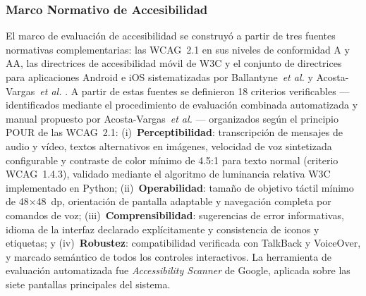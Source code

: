 \documentclass[journal]{IEEEtran}
\begin{document}
			\subsubsection{Marco Normativo de Accesibilidad}
				El marco de evaluaci\'on de accesibilidad se construy\'o a partir de tres fuentes normativas complementarias: las WCAG~2.1 \cite{w3c2018} en sus niveles de conformidad A y AA, las directrices de accesibilidad m\'ovil de W3C y el conjunto de directrices para aplicaciones Android e iOS sistematizadas por Ballantyne~\textit{et al.} \cite{ballantyne2018} y Acosta-Vargas~\textit{et al.} \cite{acosta2021}. A partir de estas fuentes se definieron 18 criterios verificables ---identificados mediante el procedimiento de evaluaci\'on combinada automatizada y manual propuesto por Acosta-Vargas~\textit{et al.} \cite{acosta2021}--- organizados seg\'un el principio POUR de las WCAG~2.1: (i)~\textbf{Perceptibilidad}: transcripci\'on de mensajes de audio y v\'ideo, textos alternativos en im\'agenes, velocidad de voz sintetizada configurable y contraste de color m\'inimo de 4.5:1 para texto normal (criterio WCAG~1.4.3), validado mediante el algoritmo de luminancia relativa W3C implementado en Python; (ii)~\textbf{Operabilidad}: tama\~no de objetivo t\'actil m\'inimo de 48$\times$48~dp, orientaci\'on de pantalla adaptable y navegaci\'on completa por comandos de voz; (iii)~\textbf{Comprensibilidad}: sugerencias de error informativas, idioma de la interfaz declarado expl\'icitamente y consistencia de iconos y etiquetas; y (iv)~\textbf{Robustez}: compatibilidad verificada con TalkBack y VoiceOver, y marcado sem\'antico de todos los controles interactivos. La herramienta de evaluaci\'on automatizada fue \textit{Accessibility Scanner} de Google, aplicada sobre las siete pantallas principales del sistema.
				
\end{document}
